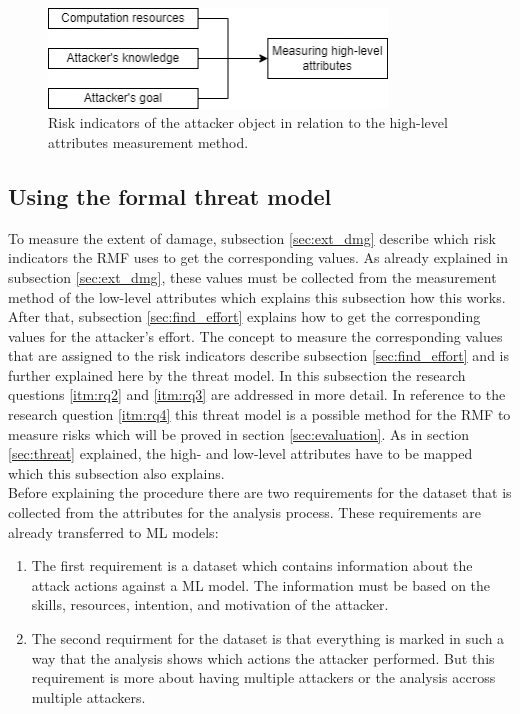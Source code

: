 \begin{figure}[ht!]
  \centering
  \includegraphics[width=9cm]{pictures/measure_effort.png}
  \caption{Risk indicators of the attacker object in relation to the high-level attributes measurement method.}
  \label{fig:measure_effort}
\end{figure}

\subsection{Using the formal threat model}
\label{sec:use_threat_model}

To measure the extent of damage, subsection \ref{sec:ext_dmg} describe which risk indicators the RMF uses to get the corresponding values. As already explained in subsection \ref{sec:ext_dmg}, these values must be collected from the measurement method of the low-level attributes which explains this subsection how this works. After that, subsection \ref{sec:find_effort} explains how to get the corresponding values for the attacker's effort. The concept to measure the corresponding values that are assigned to the risk indicators describe subsection \ref{sec:find_effort} and is further
explained here by the threat model. In this subsection the research questions \ref{itm:rq2} and \ref{itm:rq3} are addressed in more detail. In reference to the research question \ref{itm:rq4} this
threat model is a possible method for the RMF to measure risks which will be proved in section \ref{sec:evaluation}. As in section \ref{sec:threat} explained, the high- and low-level attributes have to be mapped which this subsection also explains. \\
Before explaining the procedure there are two requirements for the dataset that is collected from the attributes \cite{DBLP:conf/crisis/DoynikovaNGK20} for the analysis process. These requirements are already transferred to ML models:

\begin{enumerate}
  \item The first requirement is a dataset which contains information about the attack actions against a ML model. The information must be based on the skills, resources, intention, and motivation of the attacker.
  \item The second requirment for the dataset is that everything is marked in such a way that the analysis shows which actions the attacker performed. But this requirement is more about having multiple attackers or the analysis accross multiple attackers.
\end{enumerate}

